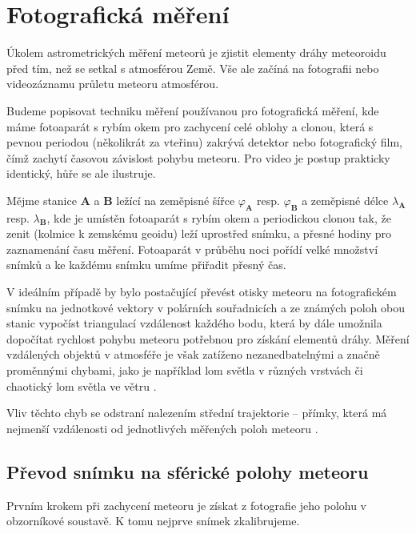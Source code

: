 \section{Fotografická měření\label{sec:foto}}
Úkolem astrometrických měření meteorů je zjistit elementy dráhy meteoroidu před tím, než se setkal s atmosférou Země. Vše ale začíná na fotografii nebo videozáznamu průletu meteoru atmosférou.

Budeme popisovat techniku měření používanou pro fotografická měření, kde máme fotoaparát s rybím okem pro zachycení celé oblohy a clonou, která s pevnou periodou (několikrát za vteřinu) zakrývá detektor nebo fotografický film, čímž zachytí časovou závislost pohybu meteoru.  Pro video je postup prakticky identický, hůře se ale ilustruje.

\medskip

Mějme stanice \textbf{A} a \textbf{B} ležící na zeměpisné šířce $\varphi_\mathbf{A}$ resp. $\varphi_\mathbf{B}$ a zeměpisné délce $\lambda_\mathbf{A}$ resp. $\lambda_\mathbf{B}$, kde je umístěn fotoaparát s rybím okem a periodickou clonou tak, že zenit (kolmice k zemskému geoidu) leží uprostřed snímku, a přesné hodiny pro zaznamenání času měření. Fotoaparát v průběhu noci pořídí velké množství snímků a ke každému snímku umíme přiřadit přesný čas.

\smallskip

V ideálním případě by bylo postačující převést otisky meteoru na fotografickém snímku na jednotkové vektory v polárních souřadnicích a ze známých poloh obou stanic vypočíst triangulací vzdálenost každého bodu, která by dále umožnila dopočítat rychlost pohybu meteoru potřebnou pro získání elementů dráhy. Měření vzdálených objektů v atmosféře je však zatíženo nezanedbatelnými a značně proměnnými chybami, jako je například lom světla v různých vrstvách či chaotický lom světla ve větru \cite{radiosurvey}.

Vliv těchto chyb se odstraní nalezením střední trajektorie -- přímky, která má nejmenší vzdálenosti od jednotlivých měřených poloh meteoru \cite{ceplecha}.

\subsection{Převod snímku na sférické polohy meteoru}
Prvním krokem při zachycení meteoru je získat z fotografie jeho polohu v obzorníkové soustavě. K tomu nejprve snímek zkalibrujeme.

